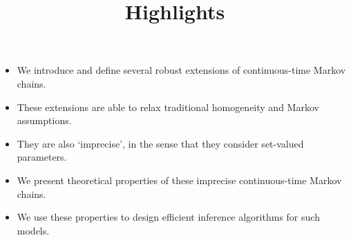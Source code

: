 \documentclass{article}
\title{Highlights}
\author{}
\begin{document}
\date{}
\maketitle

\begin{itemize}
\item We introduce and define several robust extensions of continuous-time Markov chains.
\item These extensions are able to relax  traditional homogeneity and Markov assumptions.
\item They are also `imprecise', in the sense that they consider set-valued parameters.
\item We present theoretical properties of these imprecise continuous-time Markov chains.
\item We use these properties to design efficient inference algorithms for such models.
\end{itemize}
\end{document}
